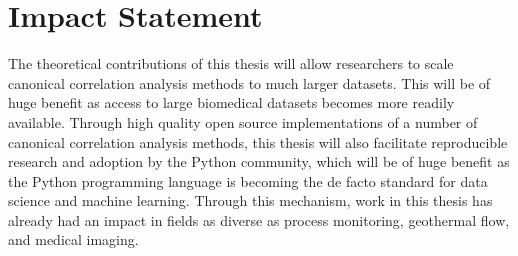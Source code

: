 \chapter*{Impact Statement}

The theoretical contributions of this thesis will allow researchers to scale canonical correlation analysis methods to much larger datasets. This will be of huge benefit as access to large biomedical datasets becomes more readily available.
Through high quality open source implementations of a number of canonical correlation analysis methods, this thesis will also facilitate reproducible research and adoption by the Python community, which will be of huge benefit as the Python programming language is becoming the de facto standard for data science and machine learning.
Through this mechanism, work in this thesis has already had an impact in fields as diverse as process monitoring, geothermal flow, and medical imaging.